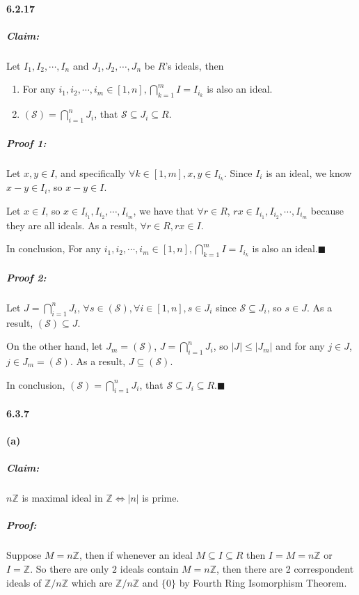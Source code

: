 \documentclass[11pt]{article}
\begin{document}
	\paragraph{6.2.17}
		\subparagraph{Claim:} Let $I_1, I_2, \cdots, I_n$ and $J_1, J_2, \cdots, J_n$ be $R$'s ideals, then
		\begin{enumerate}
			\item For any $i_1, i_2, \cdots, i_m \in [1, n], \bigcap_{k = 1}^m I = I_{i_k}$ is also an ideal.
			\item $(\mathcal{S}) = \bigcap_{i = 1}^nJ_i$, that $\mathcal{S} \subseteq J_i \subseteq R$.
		\end{enumerate}
		\subparagraph{Proof 1:} Let $x, y \in I$, and specifically $\forall k \in [1, m], x, y \in I_{i_k}$. Since $I_i$ is an ideal, we know $x - y \in I_i$, so $x - y \in I$.
		
		Let $x \in I$, so $x \in I_{i_1}, I_{i_2}, \cdots, I_{i_m}$, we have that $\forall r \in R$, $rx \in I_{i_1}, I_{i_2}, \cdots, I_{i_m}$ because they are all ideals. As a result, $\forall r \in R, rx \in I$.
		
		In conclusion, For any $i_1, i_2, \cdots, i_m \in [1, n], \bigcap_{k = 1}^m I = I_{i_k}$ is also an ideal.$\blacksquare$
		
		\subparagraph{Proof 2:} Let $J = \bigcap_{i = 1}^nJ_i$, $\forall s \in (\mathcal{S}), \forall i \in [1, n], s \in J_i$ since $\mathcal{S} \subseteq J_i$, so $s \in J$. As a result, $(\mathcal{S}) \subseteq J$.
		
		On the other hand, let $J_m = (\mathcal{S})$, $J = \bigcap_{i = 1}^nJ_i$, so $|J| \leq |J_m|$ and for any $j \in J$, $j \in J_m = (\mathcal{S})$. As a result, $J \subseteq (\mathcal{S})$.
		
		In conclusion, $(\mathcal{S}) = \bigcap_{i = 1}^nJ_i$, that $\mathcal{S} \subseteq J_i \subseteq R$.$\blacksquare$
	\paragraph{6.3.7}
	\paragraph{(a)}
		\subparagraph{Claim:} $n\mathbb{Z}$ is maximal ideal in $\mathbb{Z} \Leftrightarrow |n|$ is prime.
		\subparagraph{Proof:} Suppose $M = n\mathbb{Z}$, then if whenever an ideal $M \subseteq I \subseteq R$ then $I = M = n\mathbb{Z}$ or $I = \mathbb{Z}$. So there are only $2$ ideals contain $M = n\mathbb{Z}$, then there are 2 correspondent ideals of $\mathbb{Z}/n\mathbb{Z}$ which are $\mathbb{Z}/n\mathbb{Z}$ and $\{0\}$ by Fourth Ring Isomorphism Theorem.
		
\end{document}
